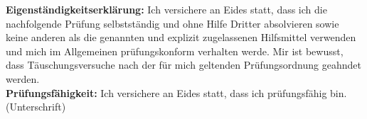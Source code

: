 \documentclass[11pt,a4paper,headings=standardclasses]{scrartcl}
\begin{document}
\begin{titlepage}
\begin{center}
{{    \textbf{Eigenständigkeitserklärung: }Ich versichere an Eides statt, dass ich die nachfolgende Prüfung selbstständig und ohne Hilfe Dritter absolvieren sowie keine anderen als die genannten und explizit zugelassenen Hilfsmittel verwenden und mich im Allgemeinen prüfungskonform verhalten werde. Mir ist bewusst, dass Täuschungsversuche nach der für mich geltenden Prüfungsordnung geahndet werden.\\
    
    \textbf{Prüfungsfähigkeit: }Ich versichere an Eides statt, dass ich prüfungsfähig bin.
\\[5ex]
        (Unterschrift)\ \hrulefill
      }}

\vfill
      
    \end{center}
  \end{titlepage}

%

\cleardoubleemptypage
\setcounter{page}{1}
\pagestyle{scrheadings}


\newpage
\null\newpage

\newpage
\null\newpage
\null\newpage

\newpage
\null\newpage
\null\newpage

\newpage
\null\newpage
\null\newpage

\newpage
\null\newpage
\null\newpage

\newpage
\null\newpage
\null\newpage

\newpage
\null\newpage
\null\newpage
\cleardoubleplainpage



%


\end{document}
